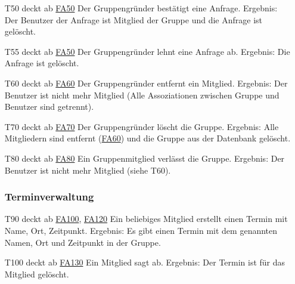 \documentclass{scrartcl}
\begin{document}
\begin{itemize}
	\item[T50] deckt ab \hyperlink{FA50}{FA50}  \newline
	Der Gruppengründer bestätigt eine Anfrage. \newline
	Ergebnis: Der Benutzer der Anfrage ist Mitglied der Gruppe und die Anfrage ist gelöscht.
	
	\item[T55] deckt ab \hyperlink{FA50}{FA50}  \newline
	Der Gruppengründer lehnt eine Anfrage ab. \newline
	Ergebnis: Die Anfrage ist gelöscht.
	
	\item[T60] deckt ab \hyperlink{FA60}{FA60}  \newline
	Der Gruppengründer entfernt ein Mitglied.  \newline
	Ergebnis: Der Benutzer ist nicht mehr Mitglied (Alle Assoziationen zwischen Gruppe und Benutzer sind getrennt).
	
	\item[T70] deckt ab \hyperlink{FA70}{FA70}  \newline
	Der Gruppengründer löscht die Gruppe.  \newline
	Ergebnis: Alle Mitgliedern sind entfernt (\hyperlink{FA60}{FA60}) und die Gruppe aus der Datenbank gelöscht.
	
	\item[T80] deckt ab \hyperlink{FA80}{FA80}  \newline
	Ein Gruppenmitglied verlässt die Gruppe.  \newline
	Ergebnis: Der Benutzer ist nicht mehr Mitglied (siehe T60).
	
	\subsubsection{Terminverwaltung}
	
	\item[T90] deckt ab \hyperlink{FA100}{FA100}, \hyperlink{FA120}{FA120}  \newline
	Ein beliebiges Mitglied erstellt einen Termin mit Name, Ort, Zeitpunkt.  \newline
	Ergebnis: Es gibt einen Termin mit dem genannten Namen, Ort und Zeitpunkt in der Gruppe.
	
	\item [T100] deckt ab \hyperlink{FA130}{FA130}  \newline
	Ein Mitglied sagt ab.  \newline
	Ergebnis: Der Termin ist für das Mitglied gelöscht.
	

\end{itemize}
\end{document}
